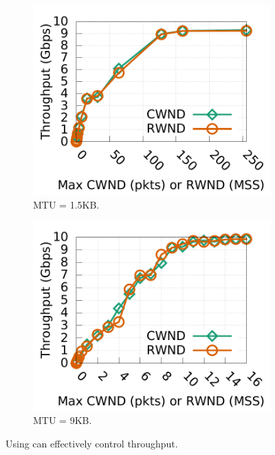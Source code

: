 \begin{figure}[t]
        \centering
        \begin{subfigure}[b]{0.225\textwidth}
                \centering
                \includegraphics[width=\textwidth]{figures/new_enforce/new_tput_cwnd_rwnd_cubic_15k.pdf}
                \caption{MTU = 1.5KB.}
                \label{effectiveness_15k}
        \end{subfigure}
        \begin{subfigure}[b]{0.225\textwidth}
                \centering
                \includegraphics[width=\textwidth]{figures/new_enforce/new_tput_cwnd_rwnd_cubic_9k.pdf}
                \caption{MTU = 9KB.}
                \label{effectiveness_9k}
        \end{subfigure}
        \caption{Using \rwnd{} can effectively control throughput.}
        \label{rwnd_effectiveness}
\end{figure}
